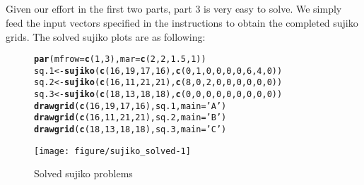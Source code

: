 \documentclass[12pt]{article}\usepackage[]{graphicx}\usepackage[]{color}
\makeatletter
\newcommand{\hlnum}[1]{\textcolor[rgb]{0.686,0.059,0.569}{#1}}%
\newcommand{\hlstr}[1]{\textcolor[rgb]{0.192,0.494,0.8}{#1}}%
\newcommand{\hlstd}[1]{\textcolor[rgb]{0.345,0.345,0.345}{#1}}%
\newcommand{\hlkwb}[1]{\textcolor[rgb]{0.69,0.353,0.396}{#1}}%
\newcommand{\hlkwc}[1]{\textcolor[rgb]{0.333,0.667,0.333}{#1}}%
\newcommand{\hlkwd}[1]{\textcolor[rgb]{0.737,0.353,0.396}{\textbf{#1}}}%
\newenvironment{kframe}{%
 \def\at@end@of@kframe{}%
 \ifinner\ifhmode%
  \def\at@end@of@kframe{\end{minipage}}%
  \begin{minipage}{\columnwidth}%
 \fi\fi%
 \def\FrameCommand##1{\hskip\@totalleftmargin \hskip-\fboxsep
 \colorbox{shadecolor}{##1}\hskip-\fboxsep
     \hskip-\linewidth \hskip-\@totalleftmargin \hskip\columnwidth}%
 \MakeFramed {\advance\hsize-\width
   \@totalleftmargin\z@ \linewidth\hsize
   \@setminipage}}%
 {\par\unskip\endMakeFramed%
 \at@end@of@kframe}
\newenvironment{knitrout}{}{} %
\makeatother
\begin{document}
\subsection{}
Given our effort in the first two parts, part 3 is very easy to solve. We simply feed the input vectors specified in the instructions to obtain the completed sujiko grids. The solved sujiko plots are as following:



\begin{figure}[htpb]
\begin{center}
\begin{knitrout}
\color{fgcolor}\begin{kframe}
\begin{alltt}
\hlkwd{par}\hlstd{(}\hlkwc{mfrow}\hlstd{=}\hlkwd{c}\hlstd{(}\hlnum{1}\hlstd{,} \hlnum{3}\hlstd{),} \hlkwc{mar}\hlstd{=}\hlkwd{c}\hlstd{(}\hlnum{2}\hlstd{,} \hlnum{2}\hlstd{,} \hlnum{1.5}\hlstd{,} \hlnum{1}\hlstd{))}
\hlstd{sq.1} \hlkwb{<-} \hlkwd{sujiko}\hlstd{(}\hlkwd{c}\hlstd{(}\hlnum{16}\hlstd{,} \hlnum{19}\hlstd{,} \hlnum{17}\hlstd{,} \hlnum{16}\hlstd{),} \hlkwd{c}\hlstd{(}\hlnum{0}\hlstd{,} \hlnum{1}\hlstd{,} \hlnum{0}\hlstd{,} \hlnum{0}\hlstd{,} \hlnum{0}\hlstd{,} \hlnum{0}\hlstd{,} \hlnum{6}\hlstd{,} \hlnum{4}\hlstd{,} \hlnum{0}\hlstd{))}
\hlstd{sq.2} \hlkwb{<-} \hlkwd{sujiko}\hlstd{(}\hlkwd{c}\hlstd{(}\hlnum{16}\hlstd{,} \hlnum{11}\hlstd{,} \hlnum{21}\hlstd{,} \hlnum{21}\hlstd{),} \hlkwd{c}\hlstd{(}\hlnum{8}\hlstd{,} \hlnum{0}\hlstd{,} \hlnum{2}\hlstd{,} \hlnum{0}\hlstd{,} \hlnum{0}\hlstd{,} \hlnum{0}\hlstd{,} \hlnum{0}\hlstd{,} \hlnum{0}\hlstd{,} \hlnum{0}\hlstd{))}
\hlstd{sq.3} \hlkwb{<-} \hlkwd{sujiko}\hlstd{(}\hlkwd{c}\hlstd{(}\hlnum{18}\hlstd{,} \hlnum{13}\hlstd{,} \hlnum{18}\hlstd{,} \hlnum{18}\hlstd{),} \hlkwd{c}\hlstd{(}\hlnum{0}\hlstd{,} \hlnum{0}\hlstd{,} \hlnum{0}\hlstd{,} \hlnum{0}\hlstd{,} \hlnum{0}\hlstd{,} \hlnum{0}\hlstd{,} \hlnum{0}\hlstd{,} \hlnum{0}\hlstd{,} \hlnum{0}\hlstd{))}
\hlkwd{drawgrid}\hlstd{(}\hlkwd{c}\hlstd{(}\hlnum{16}\hlstd{,} \hlnum{19}\hlstd{,} \hlnum{17}\hlstd{,} \hlnum{16}\hlstd{), sq.1,} \hlkwc{main}\hlstd{=}\hlstr{'A'}\hlstd{)}
\hlkwd{drawgrid}\hlstd{(}\hlkwd{c}\hlstd{(}\hlnum{16}\hlstd{,} \hlnum{11}\hlstd{,} \hlnum{21}\hlstd{,} \hlnum{21}\hlstd{), sq.2,} \hlkwc{main}\hlstd{=}\hlstr{'B'}\hlstd{)}
\hlkwd{drawgrid}\hlstd{(}\hlkwd{c}\hlstd{(}\hlnum{18}\hlstd{,} \hlnum{13}\hlstd{,} \hlnum{18}\hlstd{,} \hlnum{18}\hlstd{), sq.3,} \hlkwc{main}\hlstd{=}\hlstr{'C'}\hlstd{)}
\end{alltt}
\end{kframe}
\texttt{[image: figure/sujiko\_solved-1]} 

\end{knitrout}

\caption{Solved sujiko problems}
\label{fig:four}
\end{center}
\end{figure}
\end{document}
